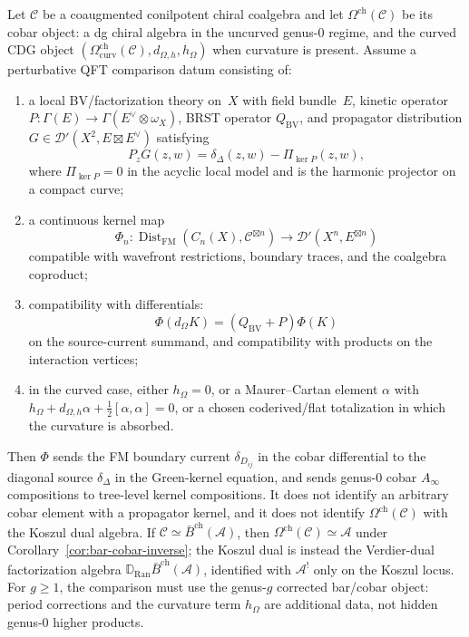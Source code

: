 \begin{theorem}\label{thm:cobar-propagator-comparison}
\label{conj:cobar-physical}
Let $\mathcal{C}$ be a coaugmented conilpotent chiral coalgebra and
let $\Omega^{\mathrm{ch}}(\mathcal{C})$ be its cobar object: a dg
chiral algebra in the uncurved genus-$0$ regime, and the curved CDG
object
$(\Omega^{\mathrm{ch}}_{\mathrm{curv}}(\mathcal{C}),d_{\Omega,h},h_\Omega)$
when curvature is present. Assume a perturbative QFT comparison datum
consisting of:
\begin{enumerate}[label=\textup{(\roman*)}]
\item a local BV/factorization theory on~$X$ with field bundle~$E$,
 kinetic operator $P\colon \Gamma(E)\to\Gamma(E^\vee\otimes\omega_X)$,
 BRST operator $Q_{\mathrm{BV}}$, and propagator distribution
 $G\in\mathcal{D}'(X^2,E\boxtimes E^\vee)$ satisfying
 \[
 P_zG(z,w)=\delta_\Delta(z,w)-\Pi_{\ker P}(z,w),
 \]
 where $\Pi_{\ker P}=0$ in the acyclic local model and is the harmonic
 projector on a compact curve;
\item a continuous kernel map
 \[
 \Phi_n\colon
 \operatorname{Dist}_{\mathrm{FM}}(C_n(X),\mathcal{C}^{\boxtimes n})
 \longrightarrow
 \mathcal{D}'(X^n,E^{\boxtimes n})
 \]
 compatible with wavefront restrictions, boundary traces, and the
 coalgebra coproduct;
\item compatibility with differentials:
 \[
 \Phi(d_{\Omega}K)
 =
 (Q_{\mathrm{BV}}+P)\Phi(K)
 \]
 on the source-current summand, and compatibility with products on the
 interaction vertices;
\item in the curved case, either $h_\Omega=0$, or a
 Maurer--Cartan element $\alpha$ with
 $h_\Omega+d_{\Omega,h}\alpha+\frac12[\alpha,\alpha]=0$, or a chosen
 coderived/flat totalization in which the curvature is absorbed.
\end{enumerate}
Then $\Phi$ sends the FM boundary current
$\delta_{D_{ij}}$ in the cobar differential to the diagonal source
$\delta_\Delta$ in the Green-kernel equation, and sends genus-$0$
cobar $A_\infty$ compositions to tree-level kernel compositions.
It does not identify an arbitrary cobar element with a propagator
kernel, and it does not identify
$\Omega^{\mathrm{ch}}(\mathcal{C})$ with the Koszul dual algebra.
If $\mathcal{C}\simeq \bar{B}^{\mathrm{ch}}(\mathcal{A})$, then
$\Omega^{\mathrm{ch}}(\mathcal{C})\simeq\mathcal{A}$ under
Corollary~\ref{cor:bar-cobar-inverse}; the Koszul dual is instead
the Verdier-dual factorization algebra
$\mathbb{D}_{\operatorname{Ran}}\bar{B}^{\mathrm{ch}}(\mathcal{A})$,
identified with $\mathcal{A}^!$ only on the Koszul locus.
For $g\geq1$, the comparison must use the genus-$g$ corrected
bar/cobar object: period corrections and the curvature term
$h_\Omega$ are additional data, not hidden genus-$0$ higher products.
\end{theorem}

